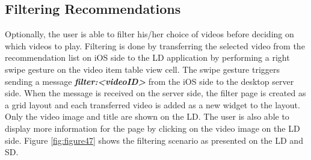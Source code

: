\subsection{Filtering Recommendations}
Optionally, the user is able to filter his/her choice of videos before deciding on which videos to play. Filtering is done by transferring the selected video from the recommendation list on iOS side to the LD application by performing a right swipe gesture on the video item table view cell. The swipe gesture triggers sending a message \textbf{\textit{filter:<videoID>}} from the iOS side to the desktop server side. When the message is received on the server side, the filter page is created as a grid layout and each transferred video is added as a new widget to the layout. Only the video image and title are shown on the LD. The user is also able to display more information for the page by clicking on the video image on the LD side. Figure \ref{fig:figure47} shows the filtering scenario as presented on the LD and SD.    
